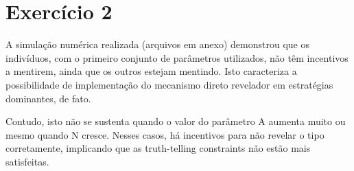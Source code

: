 \documentclass[10pt]{article}
\begin{document}
\section*{Exercício 2}

A simulação numérica realizada (arquivos em anexo) demonstrou que os indivíduos, com o primeiro conjunto de parâmetros utilizados, não têm incentivos a mentirem, ainda que os outros estejam mentindo. Isto caracteriza a possibilidade de implementação do mecanismo direto revelador em estratégias dominantes, de fato. 

Contudo, isto não se sustenta quando o valor do parâmetro A aumenta muito ou mesmo quando N cresce. Nesses casos, há incentivos para não revelar o tipo corretamente, implicando que as truth-telling constraints não estão mais satisfeitas.
\end{document}
